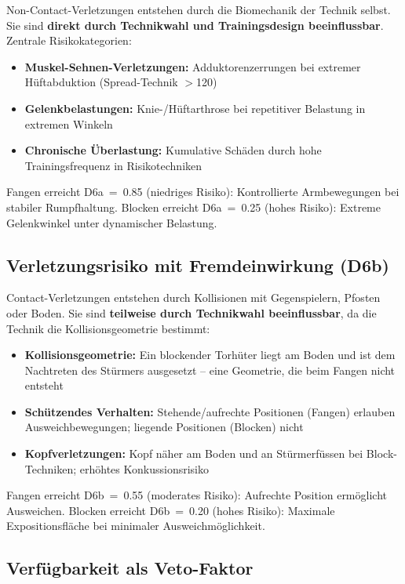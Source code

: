 \documentclass[12pt,a4paper]{article}
\begin{document}
Non-Contact-Verletzungen entstehen durch die Biomechanik der Technik selbst. Sie sind \textbf{direkt durch Technikwahl und Trainingsdesign beeinflussbar}. Zentrale Risikokategorien:

\begin{itemize}[nosep]
  \item \textbf{Muskel-Sehnen-Verletzungen:} Adduktorenzerrungen bei extremer H\"uftabduktion (Spread-Technik $>$120\textdegree{})
  \item \textbf{Gelenkbelastungen:} Knie-/H\"uftarthrose bei repetitiver Belastung in extremen Winkeln
  \item \textbf{Chronische \"Uberlastung:} Kumulative Sch\"aden durch hohe Trainingsfrequenz in Risikotechniken
\end{itemize}

Fangen erreicht D6a~=~0.85 (niedriges Risiko): Kontrollierte Armbewegungen bei stabiler Rumpfhaltung. Blocken erreicht D6a~=~0.25 (hohes Risiko): Extreme Gelenkwinkel unter dynamischer Belastung.

\subsection{Verletzungsrisiko mit Fremdeinwirkung (D6b)}

Contact-Verletzungen entstehen durch Kollisionen mit Gegenspielern, Pfosten oder Boden. Sie sind \textbf{teilweise durch Technikwahl beeinflussbar}, da die Technik die Kollisionsgeometrie bestimmt:

\begin{itemize}[nosep]
  \item \textbf{Kollisionsgeometrie:} Ein blockender Torh\"uter liegt am Boden und ist dem Nachtreten des St\"urmers ausgesetzt -- eine Geometrie, die beim Fangen nicht entsteht
  \item \textbf{Sch\"utzendes Verhalten:} Stehende/aufrechte Positionen (Fangen) erlauben Ausweichbewegungen; liegende Positionen (Blocken) nicht
  \item \textbf{Kopfverletzungen:} Kopf n\"aher am Boden und an St\"urmerfüssen bei Block-Techniken; erh\"ohtes Konkussionsrisiko
\end{itemize}

Fangen erreicht D6b~=~0.55 (moderates Risiko): Aufrechte Position erm\"oglicht Ausweichen. Blocken erreicht D6b~=~0.20 (hohes Risiko): Maximale Expositionsfl\"ache bei minimaler Ausweichm\"oglichkeit.

\subsection{Verf\"ugbarkeit als Veto-Faktor}
\end{document}
